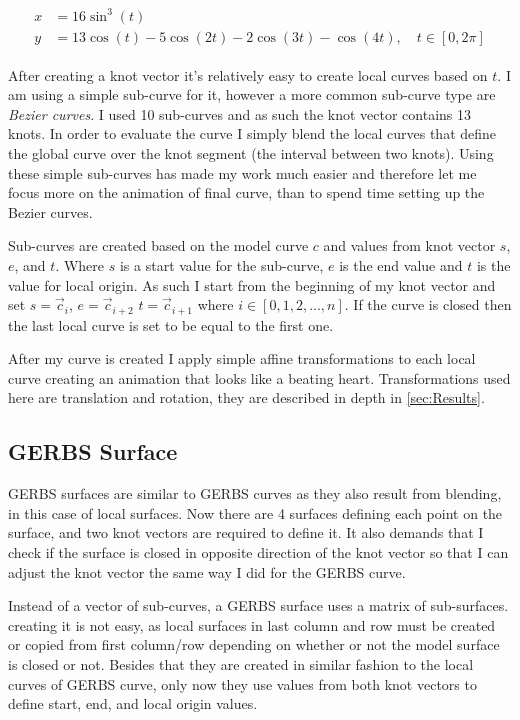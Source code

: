 \documentclass[a4paper,12pt]{extarticle}
\begin{document}
\begin{align}
\begin{split}
x &= 16 \sin^3(t) \\
y &= 13 \cos(t) - 5 \cos(2t) - 2 \cos(3t) - \cos(4t), \quad t \in [0,2\pi]
\label{eq:HeartCurve}
\end{split}
\end{align}

After creating a knot vector it's relatively easy to create local curves based on $t$. I am using a simple sub-curve for it, however a more common sub-curve type are \emph{Bezier curves}. I used 10 sub-curves and as such the knot vector contains 13 knots. In order to evaluate the curve I simply blend the local curves that define the global curve over the knot segment (the interval between two knots). Using these simple sub-curves has made my work much easier and therefore let me focus more on the animation of final curve, than to spend time setting up the Bezier curves.

Sub-curves are created based on the model curve $c$ and values from knot vector $s$, $e$, and $t$. Where $s$ is a start value for the sub-curve, $e$ is the end value and $t$ is the value for local origin. As such I start from the beginning of my knot vector and set $s = \vec{c}_{i}$, $e = \vec{c}_{i+2}$ $t = \vec{c}_{i+1}$ where $i \in [0,1,2,...,n]$. If the curve is closed then the last local curve is set to be equal to the first one.

After my curve is created I apply simple affine transformations to each local curve creating an animation that looks like a beating heart. Transformations used here are translation and rotation, they are described in depth in \cref{sec:Results}.

\subsection{GERBS Surface}
GERBS surfaces are similar to GERBS curves as they also result from blending, in this case of local surfaces. Now there are 4 surfaces defining each point on the surface, and two knot vectors are required to define it. It also demands that I check if the surface is closed in opposite direction of the knot vector so that I can adjust the knot vector the same way I did for the GERBS curve. 

Instead of a vector of sub-curves, a GERBS surface uses a matrix of sub-surfaces. creating it is not easy, as local surfaces in last column and row must be created or copied from first column/row depending on whether or not the model surface is closed or not. Besides that they are created in similar fashion to the local curves of GERBS curve, only now they use values from both knot vectors to define start, end, and local origin values.
\end{document}
